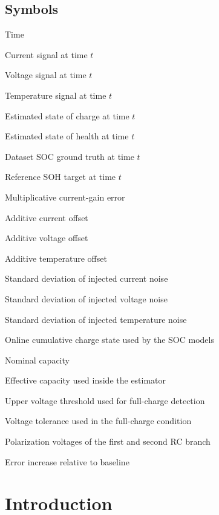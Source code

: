 \documentclass[review,nopreprintline]{elsarticle}
\begin{document}
\subsection*{Symbols}
\begin{description}[style=multiline,leftmargin=1.7cm,font=\bfseries]
\item[$t$] Time
\item[$I(t)$] Current signal at time $t$
\item[$U(t)$] Voltage signal at time $t$
\item[$T(t)$] Temperature signal at time $t$
\item[$\widehat{\mathrm{SOC}}(t)$] Estimated state of charge at time $t$
\item[$\widehat{\mathrm{SOH}}(t)$] Estimated state of health at time $t$
\item[$\mathrm{SOC}_{\mathrm{ref}}(t)$] Dataset SOC ground truth at time $t$
\item[$\mathrm{SOH}_{\mathrm{ref}}(t)$] Reference SOH target at time $t$
\item[$g_I$] Multiplicative current-gain error
\item[$\Delta I$] Additive current offset
\item[$\Delta U$] Additive voltage offset
\item[$\Delta T$] Additive temperature offset
\item[$\sigma_I$] Standard deviation of injected current noise
\item[$\sigma_U$] Standard deviation of injected voltage noise
\item[$\sigma_T$] Standard deviation of injected temperature noise
\item[$Q_c$] Online cumulative charge state used by the SOC models
\item[$C_{\mathrm{nom}}$] Nominal capacity
\item[$C_{\mathrm{eff}}$] Effective capacity used inside the estimator
\item[$U_{\max}$] Upper voltage threshold used for full-charge detection
\item[$U_{\mathrm{tol}}$] Voltage tolerance used in the full-charge condition
\item[$U_{1},U_{2}$] Polarization voltages of the first and second RC branch
\item[$\Delta\mathrm{MAE}$] Error increase relative to baseline
\end{description}
\normalsize

\section{Introduction}
\end{document}
